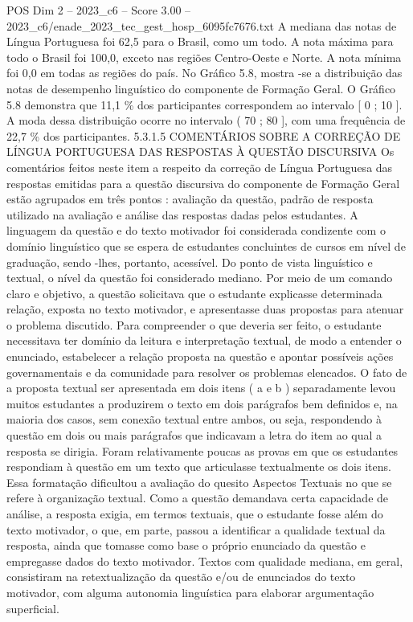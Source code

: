 \begin{textsample}{POS Dim 2 – 2023\_c6 – Score 3.00 – 2023\_c6/enade\_2023\_tec\_gest\_hosp\_6095fc7676.txt}
A mediana das notas de Língua Portuguesa foi 62,5 para o Brasil, como um todo.
A nota máxima para todo o Brasil foi 100,0, exceto nas regiões Centro-Oeste e Norte.
A nota mínima foi 0,0 em todas as regiões do país.
No Gráfico 5.8, mostra -se a distribuição das notas de desempenho linguístico do componente de Formação Geral.
O Gráfico 5.8 demonstra que 11,1 \% dos participantes correspondem ao intervalo [ 0 ; 10 ].
A moda dessa distribuição ocorre no intervalo ( 70 ; 80 ], com uma frequência de 22,7 \% dos participantes. 5.3.1.5 COMENTÁRIOS SOBRE A CORREÇÃO DE LÍNGUA PORTUGUESA DAS RESPOSTAS À QUESTÃO DISCURSIVA Os comentários feitos neste item a respeito da correção de Língua Portuguesa das respostas emitidas para a questão discursiva do componente de Formação Geral estão agrupados em três pontos : avaliação da questão, padrão de resposta utilizado na avaliação e análise das respostas dadas pelos estudantes.
A linguagem da questão e do texto motivador foi considerada condizente com o domínio linguístico que se espera de estudantes concluintes de cursos em nível de graduação, sendo -lhes, portanto, acessível.
Do ponto de vista linguístico e textual, o nível da questão foi considerado mediano.
Por meio de um comando claro e objetivo, a questão solicitava que o estudante explicasse determinada relação, exposta no texto motivador, e apresentasse duas propostas para atenuar o problema discutido.
Para compreender o que deveria ser feito, o estudante necessitava ter domínio da leitura e interpretação textual, de modo a entender o enunciado, estabelecer a relação proposta na questão e apontar possíveis ações governamentais e da comunidade para resolver os problemas elencados.
O fato de a proposta textual ser apresentada em dois itens ( a e b ) separadamente levou muitos estudantes a produzirem o texto em dois parágrafos bem definidos e, na maioria dos casos, sem conexão textual entre ambos, ou seja, respondendo à questão em dois ou mais parágrafos que indicavam a letra do item ao qual a resposta se dirigia.
Foram relativamente poucas as provas em que os estudantes respondiam à questão em um texto que articulasse textualmente os dois itens.
Essa formatação dificultou a avaliação do quesito Aspectos Textuais no que se refere à organização textual.
Como a questão demandava certa capacidade de análise, a resposta exigia, em termos textuais, que o estudante fosse além do texto motivador, o que, em parte, passou a identificar a qualidade textual da resposta, ainda que tomasse como base o próprio enunciado da questão e empregasse dados do texto motivador.
Textos com qualidade mediana, em geral, consistiram na retextualização da questão e/ou de enunciados do texto motivador, com alguma autonomia linguística para elaborar argumentação superficial.

\end{textsample}
